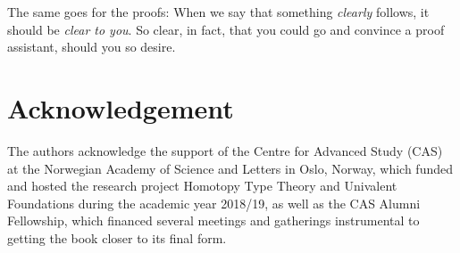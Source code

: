 The same goes for the proofs: When we say that something \emph{clearly} follows,
it should be \emph{clear to you}.
So clear, in fact, that you could go and convince a proof assistant,
should you so desire. 

\section*{Acknowledgement}

The authors acknowledge the support of the Centre for Advanced Study (CAS)
at the Norwegian Academy of Science and Letters
in Oslo, Norway, which funded and hosted the research project Homotopy
Type Theory and Univalent Foundations during the academic year 2018/19,
as well as the CAS Alumni Fellowship, which financed several meetings and gatherings instrumental to getting the book closer to its final form.

